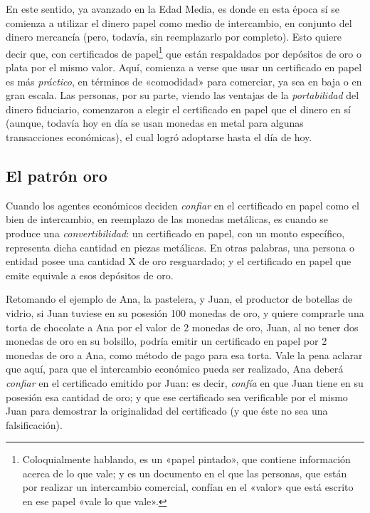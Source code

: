 \documentclass[12pt,a4paper,twoside]{book}
\begin{document}
En este sentido, ya avanzado en la Edad Media, es donde en esta época sí se comienza a utilizar el dinero papel como medio de intercambio, en conjunto del dinero mercancía (pero, todavía, sin reemplazarlo por completo). Esto quiere decir que, con certificados de papel\footnote{Coloquialmente hablando, es un «papel pintado», que contiene información acerca de lo que vale; y es un documento en el que las personas, que están por realizar un intercambio comercial, confían en el «valor» que está escrito en ese papel «vale lo que vale».} que están respaldados por depósitos de oro o plata por el mismo valor. Aquí, comienza a verse que usar un certificado en papel es más \textit{práctico}, en términos de «comodidad» para comerciar, ya sea en baja o en gran escala. Las personas, por su parte, viendo las ventajas de la \textit{portabilidad} del dinero fiduciario, comenzaron a elegir el certificado en papel que el dinero en sí (aunque, todavía hoy en día se usan monedas en metal para algunas transacciones económicas), el cual logró adoptarse hasta el día de hoy.

\subsection{El patrón oro}
Cuando los agentes económicos deciden \textit{confiar} en el certificado en papel como el bien de intercambio, en reemplazo de las monedas metálicas, es cuando se produce una \textit{convertibilidad}: un certificado en papel, con un monto específico, representa dicha cantidad en piezas metálicas. En otras palabras, una persona o entidad posee una cantidad X de oro resguardado; y el certificado en papel que emite equivale a esos depósitos de oro.

Retomando el ejemplo de Ana, la pastelera, y Juan, el productor de botellas de vidrio, si Juan tuviese en su posesión 100 monedas de oro, y quiere comprarle una torta de chocolate a Ana por el valor de 2 monedas de oro, Juan, al no tener dos monedas de oro en su bolsillo, podría emitir un certificado en papel por 2 monedas de oro a Ana, como método de pago para esa torta. Vale la pena aclarar que aquí, para que el intercambio económico pueda ser realizado, Ana deberá \textit{confiar} en el certificado emitido por Juan: es decir, \textit{confía} en que Juan tiene en su posesión esa cantidad de oro; y que ese certificado sea verificable por el mismo Juan para demostrar la originalidad del certificado (y que éste no sea una falsificación).
\end{document}
